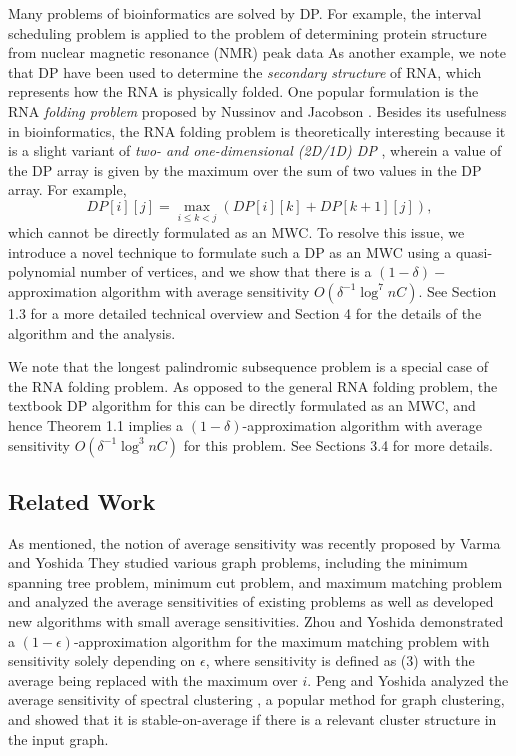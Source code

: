 \documentclass[preprint, 11pt]{article}
\begin{document}
Many problems of bioinformatics are solved by DP. For example, the interval scheduling problem is applied to the problem of determining protein structure from nuclear magnetic resonance
(NMR) peak data \cite{1, 19} As another example, we note that DP have been used to determine
the \textit{secondary structure} of RNA, which represents how the RNA is physically folded. One popular
formulation is the RNA \textit{folding problem} proposed by Nussinov and Jacobson \cite{14}. Besides its usefulness in bioinformatics, the RNA folding problem is theoretically interesting
because it is a slight variant of \textit{two- and one-dimensional (2D/1D) DP} \cite{6}, wherein a value of the
DP array is given by the maximum over the sum of two values in the DP array. For example,\\
\[
DP[i][j] = \max_{i\leq k < j} (DP[i][k] + DP[k+1][j]),
\]
which cannot be directly formulated as an MWC. To resolve this issue, we introduce a novel
technique to formulate such a DP as an MWC using a quasi-polynomial number of vertices, and
we show that there is a $(1 - \delta)-$ approximation algorithm with average sensitivity $O(\delta ^{-1} \log ^7 nC)$. See
Section 1.3 for a more detailed technical overview and Section 4 for the details of the algorithm
and the analysis.

We note that the longest palindromic subsequence problem is a special case of the RNA folding
problem. As opposed to the general RNA folding problem, the textbook DP algorithm for this
can be directly formulated as an MWC, and hence Theorem 1.1 implies a $(1 - \delta)$-approximation
algorithm with average sensitivity $O(\delta ^{-1} \log ^3 nC)$ for this problem. See Sections 3.4 for more details.

\subsection{Related Work}
As mentioned, the notion of average sensitivity was recently proposed by Varma and Yoshida \cite{17} They studied various graph problems, including the minimum spanning tree problem, minimum cut
problem, and maximum matching problem and analyzed the average sensitivities of existing problems as well as developed new algorithms with small average sensitivities. Zhou and Yoshida \cite{20} demonstrated a $(1 - \epsilon)$-approximation algorithm for the maximum matching problem with sensitivity solely depending on $\epsilon$, where sensitivity is defined as (3) with the average being replaced with
the maximum over $i$. Peng and Yoshida analyzed the average sensitivity of spectral clustering \cite{15},
a popular method for graph clustering, and showed that it is stable-on-average if there is a relevant
cluster structure in the input graph.
\end{document}
